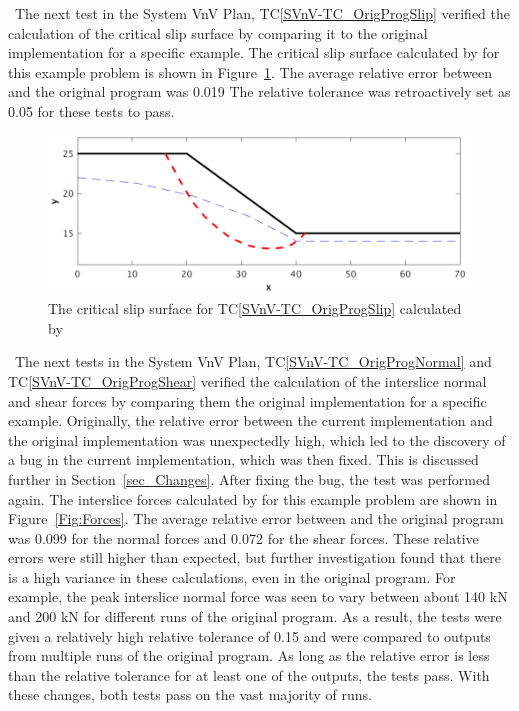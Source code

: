 \documentclass[12pt, titlepage]{article}
\newcommand{\tcref}[1]{TC\ref{#1}}
\begin{document}
~\newline \noindent The next test in the System VnV Plan, 
\tcref{SVnV-TC_OrigProgSlip} 
verified the calculation of the critical slip surface by comparing it to the 
original implementation for a specific example. The critical slip surface 
calculated by \progname{} for this example problem is shown in 
Figure~\ref{Fig:Slip}. The average relative error between \progname{} and the 
original program was 0.019 The relative tolerance was retroactively set as 0.05 
for these tests to pass.

\begin{figure}[h!]
	\begin{center}
		\includegraphics[width=1.0\textwidth]{Slip.png}
		\caption{The critical slip surface for \tcref{SVnV-TC_OrigProgSlip} 
			calculated by \progname{}}
		\label{Fig:Slip}
	\end{center}
\end{figure}

~\newline \noindent The next tests in the System VnV Plan, 
\tcref{SVnV-TC_OrigProgNormal} 
and \tcref{SVnV-TC_OrigProgShear} verified the calculation of the interslice 
normal and shear forces by comparing them the original implementation for a 
specific example. Originally, the relative error between the current 
implementation and the original implementation was unexpectedly high, which led 
to the discovery of a bug in the current implementation, which was then fixed. 
This is discussed further in Section~\ref{sec_Changes}. After fixing the bug, 
the test was performed again. The interslice forces calculated by \progname{} 
for 
this example problem are shown in Figure~\ref{Fig:Forces}. The average relative 
error between \progname{} and the original program was 0.099 for the normal 
forces and 0.072 for the shear forces. These relative errors were still higher 
than expected, but further investigation found that there is a high variance in 
these calculations, even in the original program. For example, the peak 
interslice normal force was seen to vary between about 140 \si{\kilo\newton} 
and 200 \si{\kilo\newton} for different runs of the original program. As a 
result, the tests were given a relatively high relative tolerance of 0.15 and 
were compared to outputs from multiple runs of the original program. As long as 
the relative error is less than the relative tolerance for at least one of the 
outputs, the tests pass. With these changes, both tests pass on the vast 
majority of runs.
\end{document}
